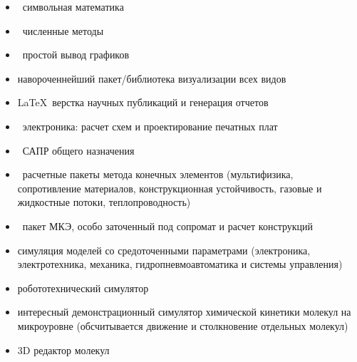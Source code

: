 
\begin{itemize}[nosep]
  \item \maxima\ символьная математика \cite{maxima}
  \item \octave\ численные методы \cite{octave}
  \item \gnuplot\ простой вывод графиков
  \item {} навороченнейший пакет/библиотека визуализации всех
  видов
  \item \LaTeX\ верстка научных публикаций и генерация отчетов
  \item {}\ электроника: расчет схем и проектирование
  печатных плат
  \item {}\ САПР общего назначения
  \item {}\ расчетные пакеты метода конечных элементов
  (мультифизика, сопротивление материалов, конструкционная устойчивость,
  газовые и жидкостные потоки, теплопроводность)
  \item {}\ пакет МКЭ, особо заточенный под сопромат и
  расчет конструкций
  \item {} симуляция моделей со средоточенными
  параметрами
  (электроника, электротехника, механика, гидропневмоавтоматика и системы
  управления)
  \item {} робототехнический симулятор
  \item {}\note{\win} интересный демонстрационный симулятор
  химической кинетики молекул на микроуровне (обсчитывается движение и
  столкновение отдельных молекул)
  \item {} 3D редактор молекул
\end{itemize}


